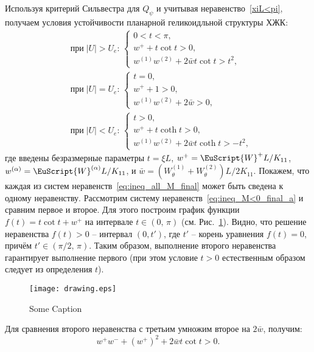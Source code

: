 Используя критерий Сильвестра для $Q_\psi$ и учитывая неравенство~\eqref{xiL<pi}, получаем условия устойчивости планарной геликоидльной структуры ХЖК:
\begin{subequations}\label{eq:ineq_all_M_final}
\begin{align}
&\text{при}\; |U|>U_e:\,
\begin{cases}
{ 0< t} < \pi,\\
w^{+}+t\cot t>0,\\
w^{(1)}w^{(2)}+2\bar{w} t \cot {t}> t^2,
\end{cases}\label{eq:ineq_M<0_final_a}\\
&\text{при}\; |U|=U_e:\,
\begin{cases}
t = 0,\\
w^{+}+1>0,\\
w^{(1)}w^{(2)}+2\bar{w}> 0,
\end{cases}\label{eq:ineq_M=0_final_b}\\
&\text{при}\; |U|<U_e:\,
\begin{cases}
{ t>0,}\\
w^{+}+ t\coth t>0,\\
w^{(1)}w^{(2)}+2\bar{w}  t \coth t>- t^2,
\end{cases}\label{eq:ineq_M>0_final_c}
\end{align}
\end{subequations}
где введены безразмерные параметры $t = \xi L$, $w^{+}={\EuScript{W}^{+} L}/{K_{11}}$, $w^{(\alpha)}={\EuScript{W}^{(\alpha)} L}/{K_{11}}$, и $\bar{w}=({W}^{(1)}_\theta+{W}^{(2)}_\theta)L/2K_{11}$.
Покажем, что каждая из систем неравенств~\eqref{eq:ineq_all_M_final} может быть сведена к одному неравенству.
Рассмотрим систему неравенств~\eqref{eq:ineq_M<0_final_a} и сравним первое и второе.
Для этого построим график функции $f(t) = t \cot{t} + w^{+}$ на интервале $t\in(0,\, \pi)$ (см. Рис.~\ref{pic:graphs_for_inequalities}).
Видно, что решение неравенства $f(t) > 0$ -- интервал $(0, t')$, где $t'$ -- корень уравнения $f(t) = 0$, причём $t'\in(\pi/2,\, \pi)$.
Таким образом, выполнение второго неравенства гарантирует выполнение первого (при этом условие $t>0$ естественным образом следует из определения $t$).
\begin{figure}\label{pic:graphs_for_inequalities}
	\centering
	\texttt{[image: drawing.eps]}
	\caption{Some Caption}
\end{figure}
Для сравнения второго неравенства с третьим умножим второе на $2\bar{w}$, получим:
\begin{equation}
w^{+}w^{-} + (w^{+})^2 + 2\bar{w} t\cot{t} > 0.
\end{equation}
